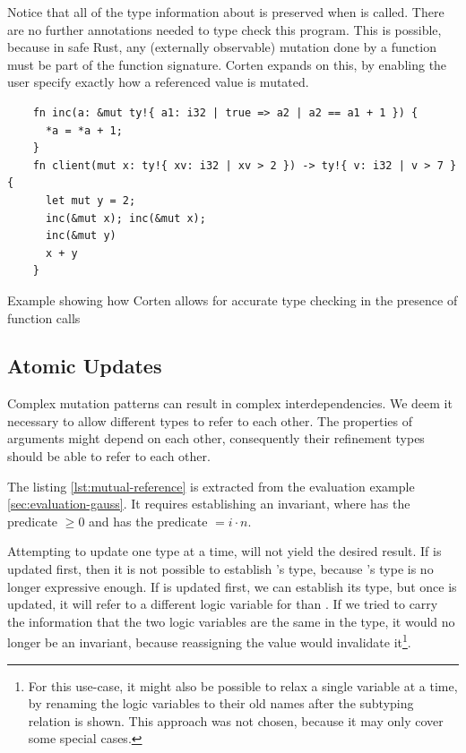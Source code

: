 \documentclass[twoside, english, final]{sdqthesis}
\theoremstyle{definition}
\begin{document}
Notice that all of the type information about  is preserved when  is called. There are no further annotations needed to type check this program. This is possible, because in safe Rust, any (externally observable) mutation done by a function must be part of the function signature. Corten expands on this, by enabling the user specify exactly how a referenced value is mutated.

\begin{listing}[h]
  \begin{verbatim}
    fn inc(a: &mut ty!{ a1: i32 | true => a2 | a2 == a1 + 1 }) {
      *a = *a + 1;
    }
    fn client(mut x: ty!{ xv: i32 | xv > 2 }) -> ty!{ v: i32 | v > 7 } {
      let mut y = 2;
      inc(&mut x); inc(&mut x);
      inc(&mut y)
      x + y
    }
  \end{verbatim}
  \caption{Example showing how Corten allows for accurate type checking in the presence of function calls }
  \label{lst:modular-calls}
\end{listing}


\subsection{Atomic Updates}\label{subsec:atomic-updates}

Complex mutation patterns can result in complex interdependencies. We deem it necessary to allow different types to refer to each other. 
The properties of arguments might depend on each other, consequently their refinement types should be able to refer to each other.

The listing \ref{lst:mutual-reference} is extracted from the evaluation example \ref{sec:evaluation-gauss}. It requires establishing an invariant, where  has the predicate $\geq 0$ and  has the predicate $= i \cdot n$.

Attempting to update one type at a time, will not yield the desired result. If  is updated first, then it is not possible to establish 's type, because 's type is no longer expressive enough.
If  is updated first, we can establish its type, but once  is updated, it will refer to a different logic variable for  than . If we tried to carry the information that the two logic variables are the same in the type, it would no longer be an invariant, because reassigning the value would invalidate it\footnote{
  For this use-case, it might also be possible to relax a single variable at a time, by renaming the logic variables to their old names after the subtyping relation is shown. This approach was not chosen, because it may only cover some special cases.
}.
\end{document}
